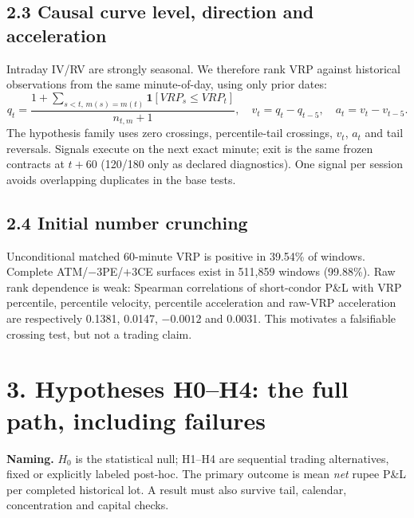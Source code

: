 \documentclass[10pt,a4paper]{article}
\begin{document}
\subsection*{2.3 Causal curve level, direction and acceleration}
Intraday IV/RV are strongly seasonal. We therefore rank VRP against historical observations from the same minute-of-day, using only prior dates:
\[
q_t=\frac{1+\sum_{s<t,\,m(s)=m(t)}\mathbf{1}[VRP_s\le VRP_t]}{n_{t,m}+1},\quad
v_t=q_t-q_{t-5},\quad a_t=v_t-v_{t-5}.
\]
The hypothesis family uses zero crossings, percentile-tail crossings, $v_t$, $a_t$ and tail reversals. Signals execute on the next exact minute; exit is the same frozen contracts at $t+60$ (120/180 only as declared diagnostics). One signal per session avoids overlapping duplicates in the base tests.

\subsection*{2.4 Initial number crunching}
Unconditional matched 60-minute VRP is positive in 39.54\% of windows. Complete ATM/$-3$PE/$+3$CE surfaces exist in 511,859 windows (99.88\%). Raw rank dependence is weak: Spearman correlations of short-condor P\&L with VRP percentile, percentile velocity, percentile acceleration and raw-VRP acceleration are respectively 0.1381, 0.0147, $-0.0012$ and 0.0031. This motivates a falsifiable crossing test, but not a trading claim.

\newpage
\section*{3. Hypotheses H0--H4: the full path, including failures}
\textbf{Naming.} $H_0$ is the statistical null; H1--H4 are sequential trading alternatives, fixed or explicitly labeled post-hoc. The primary outcome is mean \emph{net} rupee P\&L per completed historical lot. A result must also survive tail, calendar, concentration and capital checks.
\end{document}
